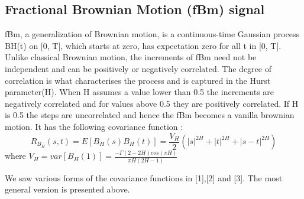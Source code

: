\documentclass[a4paper]{article}
\begin{document}
\subsection{Fractional Brownian Motion (fBm) signal}
fBm, a generalization of Brownian motion, is a continuous-time Gaussian process BH(t) on [0, T], which starts at zero, has expectation zero for all t in [0, T]​.
​Unlike classical Brownian motion, the increments of fBm need not be independent and can be positively or negatively correlated. The degree of correlation is what characterises the process and is captured in the Hurst parameter(H). When H assumes a value lower than 0.5 the increments are negatively correlated and for values above 0.5 they are positively correlated. If H is 0.5 the steps are uncorrelated and hence the fBm becomes a vanilla brownian motion.
It has the following covariance function \cite{DBLP:journals/tit/TewfikK92}:
$$R_{B_H}(s,t)=E[B_H(s)B_H(t)]=\frac{V_H}{2}(|s|^{2H}+|t|^{2H}+|s-t|^{2H})$$
where $V_H=var[B_H(1)]=\frac{-\Gamma(2-2H)cos(\pi H)}{\pi H(2H-1)}$

We saw various forms of the covariance functions in [1],[2] and [3]. The most general version is presented above. 
\end{document}
